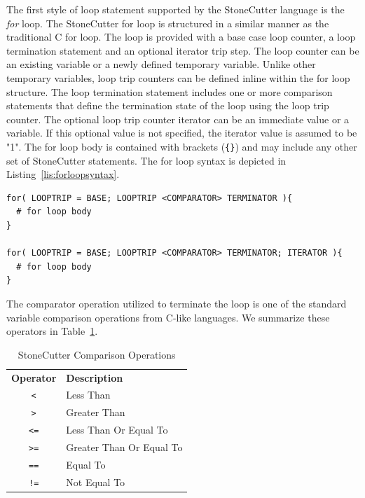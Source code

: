 \documentclass{article}
\begin{document}
The first style of loop statement supported by the StoneCutter language is the 
\textit{for} loop.  The StoneCutter for loop is structured in a similar manner as the 
traditional C for loop.  The loop is provided with a base case loop counter, a loop 
termination statement and an optional iterator trip step.  The loop counter 
can be an existing variable or a newly defined temporary variable.  Unlike other 
temporary variables, loop trip counters can be defined inline within the for loop 
structure.  The loop termination statement includes one or more comparison 
statements that define the termination state of the loop using the loop trip 
counter.  The optional loop trip counter iterator can be an immediate value or a variable.  
If this optional value is not specified, the iterator value is assumed to be "1".  The for loop body 
is contained with brackets (\texttt{\{\}}) and may include any other set of StoneCutter statements.  The for loop 
syntax is depicted in Listing~\ref{lis:forloopsyntax}.     

\vspace{0.125in}
\begin{lstlisting}[frame=single,style=base,caption={For Loop Syntax},captionpos=b,label={lis:forloopsyntax}]
for( LOOPTRIP = BASE; LOOPTRIP <COMPARATOR> TERMINATOR ){
  # for loop body
}

for( LOOPTRIP = BASE; LOOPTRIP <COMPARATOR> TERMINATOR; ITERATOR ){
  # for loop body
}
\end{lstlisting}

The comparator operation utilized to terminate the loop is one of the standard 
variable comparison operations from C-like languages.  We summarize these operators in 
Table~\ref{tab:compreops}.  

\begin{table}[h]
\begin{center}
\caption{StoneCutter Comparison Operations}
\vspace{0.125in}
\label{tab:compreops}
\begin{tabular}{|c|l|}
\hline
\textbf{Operator} & \textbf{Description} \\
\texttt{<} & Less Than\\
\hline
\texttt{>} & Greater Than\\
\hline
\texttt{<=} & Less Than Or Equal To\\
\hline
\texttt{>=} & Greater Than Or Equal To\\
\hline
\texttt{==} & Equal To\\
\hline
\texttt{!=} & Not Equal To\\
\hline
\end{tabular}
\end{center}
\end{table}
\end{document}
